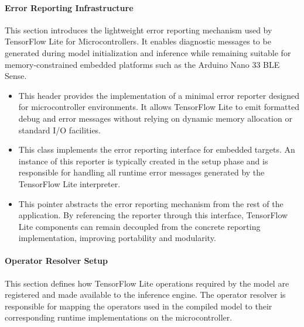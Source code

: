 \paragraph{Error Reporting Infrastructure}


This section introduces the lightweight error reporting mechanism used by TensorFlow Lite for Microcontrollers. It enables diagnostic messages to be generated during model initialization and inference while remaining suitable for memory-constrained embedded platforms such as the Arduino Nano 33 BLE Sense.

\begin{itemize}
	\item {} 
	
	This header provides the implementation of a minimal error reporter designed for microcontroller environments. It allows TensorFlow Lite to emit formatted debug and error messages without relying on dynamic memory allocation or standard I/O facilities.
	
	\item {} 
	
	This class implements the error reporting interface for embedded targets. An instance of this reporter is typically created in the setup phase and is responsible for handling all runtime error messages generated by the TensorFlow Lite interpreter.
	
	\item {} 
	
	This pointer abstracts the error reporting mechanism from the rest of the application. By referencing the reporter through this interface, TensorFlow Lite components can remain decoupled from the concrete reporting implementation, improving portability and modularity.
\end{itemize}



\paragraph{Operator Resolver Setup}

This section defines how TensorFlow Lite operations required by the model are registered and made available to the inference engine. The operator resolver is responsible for mapping the operators used in the compiled model to their corresponding runtime implementations on the microcontroller.

